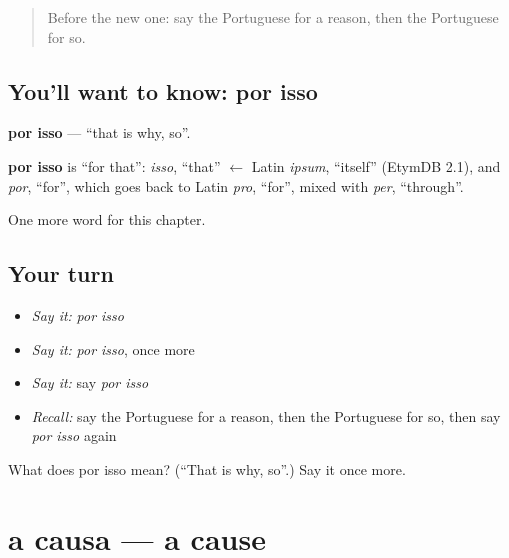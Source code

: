 \label{lesson:PT-C84-por-isso}



\begin{quote}
Before the new one: say the Portuguese for a reason, then the Portuguese for so.
\end{quote}

\subsection*{You'll want to know: por isso}
\textbf{por isso} — \textquotedblleft{}that is why, so\textquotedblright{}.

\begin{cousinweb}
\textbf{por isso} is \textquotedblleft{}for that\textquotedblright{}: \emph{isso}, \textquotedblleft{}that\textquotedblright{} $\leftarrow$ Latin \emph{ipsum}, \textquotedblleft{}itself\textquotedblright{} (EtymDB 2.1), and \emph{por}, \textquotedblleft{}for\textquotedblright{}, which goes back to Latin \emph{pro}, \textquotedblleft{}for\textquotedblright{}, mixed with \emph{per}, \textquotedblleft{}through\textquotedblright{}.
\end{cousinweb}

\begin{grammarlens}[title={What you've built}]
One more word for this chapter.
\end{grammarlens}

\subsection*{Your turn}
\begin{itemize}
\raggedright
  \item \emph{Say it:} \emph{por isso}
  \item \emph{Say it:} \emph{por isso}, once more
  \item \emph{Say it:} say \emph{por isso}
  \item \emph{Recall:} say the Portuguese for a reason, then the Portuguese for so, then say \emph{por isso} again
\end{itemize}

\begin{tcolorbox}[breakable,colback=teal!4,colframe=teal!35!black,title={Before you move on}]
What does por isso mean? (\textquotedblleft{}That is why, so\textquotedblright{}.) Say it once more.
\end{tcolorbox}
\section[a causa]{a causa — a cause}

